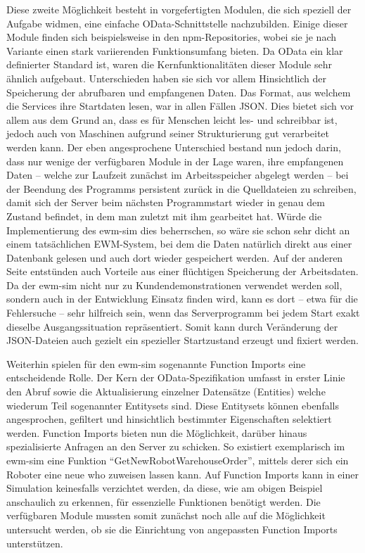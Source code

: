 Diese zweite Möglichkeit besteht in vorgefertigten Modulen, die sich speziell der Aufgabe widmen, eine einfache \ac{OData}-Schnittstelle nachzubilden.
Einige dieser Module finden sich beispielsweise in den \ac{npm}-Repositories, wobei sie je nach Variante einen stark variierenden Funktionsumfang bieten.
Da \ac{OData} ein klar definierter Standard ist, waren die Kernfunktionalitäten dieser Module sehr ähnlich aufgebaut.
Unterschieden haben sie sich vor allem Hinsichtlich der Speicherung der abrufbaren und empfangenen Daten.
Das Format, aus welchem die Services ihre Startdaten lesen, war in allen Fällen \ac{JSON}.
Dies bietet sich vor allem aus dem Grund an, dass es für Menschen leicht les- und schreibbar ist, jedoch auch von Maschinen aufgrund seiner Strukturierung gut verarbeitet werden kann.
Der eben angesprochene Unterschied bestand nun jedoch darin, dass nur wenige der verfügbaren Module in der Lage waren, ihre empfangenen Daten -- welche zur Laufzeit zunächst im Arbeitsspeicher abgelegt werden -- bei der Beendung des Programms persistent zurück in die Quelldateien zu schreiben, damit sich der Server beim nächsten Programmstart wieder in genau dem Zustand befindet, in dem man zuletzt mit ihm gearbeitet hat.
Würde die Implementierung des \ac{ewm-sim} dies beherrschen, so wäre sie schon sehr dicht an einem tatsächlichen \ac{EWM}-System, bei dem die Daten natürlich direkt aus einer Datenbank gelesen und auch dort wieder gespeichert werden.
Auf der anderen Seite entstünden auch Vorteile aus einer flüchtigen Speicherung der Arbeitsdaten.
Da der \ac{ewm-sim} nicht nur zu Kundendemonstrationen verwendet werden soll, sondern auch in der Entwicklung Einsatz finden wird, kann es dort -- etwa für die Fehlersuche -- sehr hilfreich sein, wenn das Serverprogramm bei jedem Start exakt dieselbe Ausgangssituation repräsentiert.
Somit kann durch Veränderung der \ac{JSON}-Dateien auch gezielt ein spezieller Startzustand erzeugt und fixiert werden.

Weiterhin spielen für den \ac{ewm-sim} sogenannte Function Imports eine entscheidende Rolle.
Der Kern der \ac{OData}-Spezifikation umfasst in erster Linie den Abruf sowie die Aktualisierung einzelner Datensätze (Entities) welche wiederum Teil sogenannter Entitysets sind.
Diese Entitysets können ebenfalls angesprochen, gefiltert und hinsichtlich bestimmter Eigenschaften selektiert werden.
Function Imports bieten nun die Möglichkeit, darüber hinaus spezialisierte Anfragen an den Server zu schicken.
So existiert exemplarisch im \ac{ewm-sim} eine Funktion \enquote{GetNewRobotWarehouseOrder}, mittels derer sich ein Roboter eine neue \ac{who} zuweisen lassen kann.
Auf Function Imports kann in einer Simulation keinesfalls verzichtet werden, da diese, wie am obigen Beispiel anschaulich zu erkennen, für essenzielle Funktionen benötigt werden.
Die verfügbaren Module mussten somit zunächst noch alle auf die Möglichkeit untersucht werden, ob sie die Einrichtung von angepassten Function Imports unterstützen.

